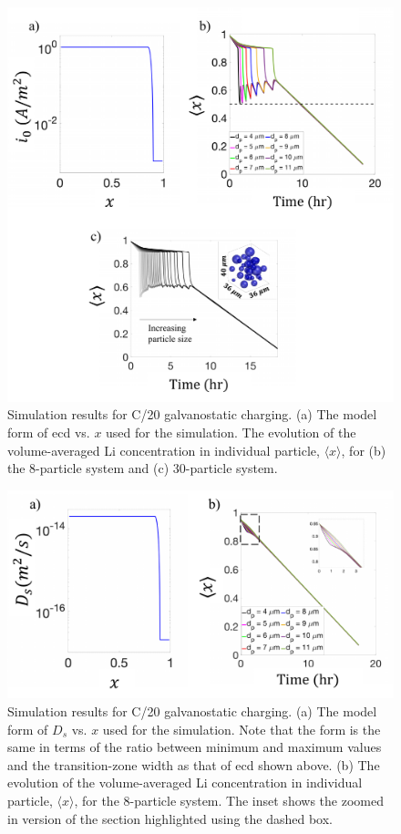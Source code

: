 \documentclass{article}
\begin{document}
\newpage
\begin{figure}[!h]
    \includegraphics[scale =0.7]{figures/modeling_figure_1.pdf}
    \caption{Simulation results for C/20 galvanostatic charging. (a) The model form of \gls{ecd} vs. $x$ used for the simulation. The evolution of the volume-averaged Li concentration in individual particle, $\langle x \rangle$, for (b) the 8-particle system and (c) 30-particle system.}
    \label{fig:model-1}
\end{figure}

\newpage
\begin{figure}[!h]
    \includegraphics[scale =0.7]{figures/modeling_figure_2_with_Ds_1000_cs_0.95.pdf}
    \caption{Simulation results for C/20 galvanostatic charging. (a) The model form of $D_s$ vs. $x$ used for the simulation. Note that the form is the same in terms of the ratio between minimum and maximum values and the transition-zone width as that of \gls{ecd} shown above. (b) The evolution of the volume-averaged Li concentration in individual particle, $\langle x \rangle$, for the 8-particle system. The inset shows the zoomed in version of the section highlighted using the dashed box.}
    \label{fig:model-2}
\end{figure}


\newpage


\end{document}

